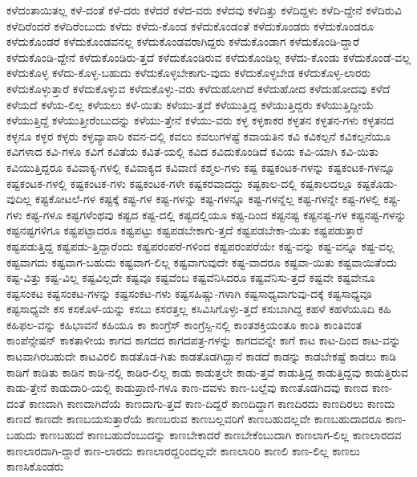 {ಕಳೆದಂತಾಯಿತಲ್ಲ
ಕಳೆ-ದಂತೆ
ಕಳೆ-ದರು
ಕಳೆದರೆ
ಕಳೆದ-ವರು
ಕಳೆದವು
ಕಳೆದಿತ್ತು
ಕಳೆದಿದ್ದಳು
ಕಳೆದಿ-ದ್ದೇನೆ
ಕಳೆದಿರುವಿ
ಕಳೆದಿರೆಂದರೆ
ಕಳೆದಿರೆಂಬುದು
ಕಳೆದು
ಕಳೆದು-ಕೊಂಡ
ಕಳೆದುಕೊಂಡಂತೆ
ಕಳೆದುಕೊಂಡರು
ಕಳೆದುಕೊಂಡರೂ
ಕಳೆದುಕೊಂಡರೆ
ಕಳೆದುಕೊಂಡವನಲ್ಲ
ಕಳೆದುಕೊಂಡವರಾಗಿದ್ದರು
ಕಳೆದುಕೊಂಡಾಗ
ಕಳೆದುಕೊಂಡಿ-ದ್ದಾರೆ
ಕಳೆದುಕೊಂಡಿ-ದ್ದೇನೆ
ಕಳೆದುಕೊಂಡಿರು-ತ್ತದೆ
ಕಳೆದುಕೊಂಡಿರುವ
ಕಳೆದುಕೊಂಡಿಲ್ಲ
ಕಳೆದು-ಕೊಂಡು
ಕಳೆದುಕೊಂಡೆ-ವಲ್ಲ
ಕಳೆದುಕೊಳ್ಳ
ಕಳೆದು-ಕೊಳ್ಳ-ಬಹುದು
ಕಳೆದುಕೊಳ್ಳಬೇಕಾಗು-ವುದು
ಕಳೆದುಕೊಳ್ಳಬೇಡ
ಕಳೆದುಕೊಳ್ಳ-ಲಾರರು
ಕಳೆದುಕೊಳ್ಳುತ್ತಾರೆ
ಕಳೆದುಕೊಳ್ಳುವ
ಕಳೆದುಕೊಳ್ಳು-ವರು
ಕಳೆದುಹೋಗಿದೆ
ಕಳೆದುಹೋದ
ಕಳೆದುಹೋದವು
ಕಳೆದೆ
ಕಳೆಯದೆ
ಕಳೆಯ-ಲಿಲ್ಲ
ಕಳೆಯಲು
ಕಳೆ-ಯಿತು
ಕಳೆಯು-ತ್ತದೆ
ಕಳೆಯುತ್ತಿದ್ದ
ಕಳೆಯುತ್ತಿದ್ದರು
ಕಳೆಯುತ್ತಿದ್ದೀಯೆ
ಕಳೆಯುತ್ತಿದ್ದೆ
ಕಳೆಯುತ್ತೀರೆಂಬುದನ್ನು
ಕಳೆಯು-ತ್ತೇನೆ
ಕಳೆಯು-ವರು
ಕಳ್ಳ
ಕಳ್ಳಕಾಕರ
ಕಳ್ಳತನ
ಕಳ್ಳತನ-ಗಳು
ಕಳ್ಳತನದ
ಕಳ್ಳನೂ
ಕಳ್ಳರ
ಕಳ್ಳರು
ಕಳ್ಳವ್ಯಾಪಾರಿ
ಕವನ-ದಲ್ಲಿ
ಕವಲು
ಕವಲುಗಳಷ್ಟೆ
ಕವಾಯತಿನ
ಕವಿ
ಕವಿಕಲ್ಪನೆ
ಕವಿಕಲ್ಪನೆಯೂ
ಕವಿಗಳಾದ
ಕವಿ-ಗಳೂ
ಕವಿಗೆ
ಕವಿತೆಯ
ಕವಿತೆ-ಯಲ್ಲಿ
ಕವಿದ
ಕವಿದುಕೊಂಡಿದೆ
ಕವಿಯ
ಕವಿ-ಯಾಗಿ
ಕವಿ-ಯಿತು
ಕವಿಯುತ್ತಿದ್ದರೂ
ಕವಿವಾಕ್ಯ-ಗಳಲ್ಲಿ
ಕವಿವಾಕ್ಯದ
ಕವಿವಾಣಿ
ಕಶ್ಮಲ-ಗಳು
ಕಷ್ಟ
ಕಷ್ಟಕಂಟಕ-ಗಳನ್ನು
ಕಷ್ಟಕಂಟಕ-ಗಳನ್ನೂ
ಕಷ್ಟಕಂಟಕ-ಗಳಲ್ಲಿ
ಕಷ್ಟಕಂಟಕ-ಗಳು
ಕಷ್ಟಕಂಟಕ-ಗಳೇ
ಕಷ್ಟಕರವಾದದ್ದು
ಕಷ್ಟಕಾಲ-ದಲ್ಲಿ
ಕಷ್ಟಕಾಲದಲ್ಲೂ
ಕಷ್ಟಕೊಡು-ವುದಿಲ್ಲ
ಕಷ್ಟಕೋಟಲೆ-ಗಳ
ಕಷ್ಟಕ್ಕೆ
ಕಷ್ಟ-ಗಳ
ಕಷ್ಟ-ಗಳನ್ನು
ಕಷ್ಟ-ಗಳನ್ನೂ
ಕಷ್ಟ-ಗಳನ್ನೆಲ್ಲ
ಕಷ್ಟ-ಗಳನ್ನೇ
ಕಷ್ಟ-ಗಳಲ್ಲಿ
ಕಷ್ಟ-ಗಳು
ಕಷ್ಟ-ಗಳೂ
ಕಷ್ಟಗಳೆಂಥವು
ಕಷ್ಟದ
ಕಷ್ಟ-ದಲ್ಲಿ
ಕಷ್ಟದಲ್ಲಿಯೂ
ಕಷ್ಟ-ದಿಂದ
ಕಷ್ಟನಷ್ಟ
ಕಷ್ಟನಷ್ಟ-ಗಳ
ಕಷ್ಟನಷ್ಟ-ಗಳನ್ನು
ಕಷ್ಟನಷ್ಟಗಳಿಗೂ
ಕಷ್ಟಪಟ್ಟಾದರೂ
ಕಷ್ಟಪಟ್ಟು
ಕಷ್ಟಪಡಬೇಕಾಗು-ತ್ತದೆ
ಕಷ್ಟಪಡಬೇಕಾ-ಯಿತು
ಕಷ್ಟಪಡುತ್ತಾರೆ
ಕಷ್ಟಪಡುತ್ತಿದ್ದ
ಕಷ್ಟಪಡು-ತ್ತಿದ್ದಾರೆಂದು
ಕಷ್ಟಪರಂಪರೆ-ಗಳಿಂದ
ಕಷ್ಟಪರಂಪರೆಯೇ
ಕಷ್ಟ-ವನ್ನು
ಕಷ್ಟ-ವನ್ನೂ
ಕಷ್ಟ-ವಲ್ಲ
ಕಷ್ಟವಾಗದು
ಕಷ್ಟವಾಗ-ಬಹುದು
ಕಷ್ಟವಾಗ-ಲಿಲ್ಲ
ಕಷ್ಟವಾಗುವುದೇ
ಕಷ್ಟ-ವಾದರೂ
ಕಷ್ಟವಾ-ಯಿತು
ಕಷ್ಟವಾಯಿತೆಂದು
ಕಷ್ಟ-ವಿತ್ತು
ಕಷ್ಟ-ವಿಲ್ಲ
ಕಷ್ಟವಿಲ್ಲದೇ
ಕಷ್ಟವೂ
ಕಷ್ಟವೆಂಬ
ಕಷ್ಟವೆನಿಸಿದರೂ
ಕಷ್ಟವೆನಿಸು-ತ್ತದೆ
ಕಷ್ಟವೇ
ಕಷ್ಟವೇನೂ
ಕಷ್ಟಸಂಕಟ
ಕಷ್ಟಸಂಕಟ-ಗಳನ್ನು
ಕಷ್ಟಸಂಕಟ-ಗಳು
ಕಷ್ಟಸಹಿಷ್ಣು-ಗಳಾಗಿ
ಕಷ್ಟಸಾಧ್ಯವಾಗುವು-ದಕ್ಕೆ
ಕಷ್ಟಸಾಧ್ಯವೂ
ಕಷ್ಟಸಾಧ್ಯವೇ
ಕಸ
ಕಸಕೊಳೆ-ಯನ್ನು
ಕಸಬು
ಕಸರತ್ತಲ್ಲ
ಕಸಿವಿಸಿಗೊಳ್ಳು-ತ್ತದೆ
ಕಸುಬಾಗಿದ್ದ
ಕಹಳೆ
ಕಹಳೆಯೂದಿ
ಕಹಿ
ಕಹಿಫಲ-ವನ್ನು
ಕಹಿಭಾವನೆ
ಕಹಿಯೂ
ಕಾ
ಕಾಂಗ್ರೆಸ್
ಕಾಂಗ್ರೆಸ್ಸಿ-ನಲ್ಲಿ
ಕಾಂತಶಕ್ತಿಯಂತೂ
ಕಾಂತಿ
ಕಾಂತಿವಂತ
ಕಾಂಪೆನ್ಸೇಷನ್
ಕಾಕತಾಳೀಯ
ಕಾಗದ
ಕಾಗದದ
ಕಾಗದಪತ್ರ-ಗಳನ್ನು
ಕಾಗದವನ್ನೇ
ಕಾಗೆ
ಕಾಟ
ಕಾಟ-ದಿಂದ
ಕಾಟ-ವನ್ನು
ಕಾಟವಾಗಿರಬಹುದೇ
ಕಾಟವಿರಲಿ
ಕಾಡತೊಡ-ಗಿತು
ಕಾಡತೊಡಗಿದ್ದಾನೆ
ಕಾಡದೆ
ಕಾಡನ್ನು
ಕಾಡಬೇಕಷ್ಟೆ
ಕಾಡಲು
ಕಾಡಿ
ಕಾಡಿಗೆ
ಕಾಡಿತು
ಕಾಡಿನ
ಕಾಡಿ-ನಲ್ಲಿ
ಕಾಡಿರ-ಲಿಲ್ಲ
ಕಾಡು
ಕಾಡುತ್ತಲೇ
ಕಾಡು-ತ್ತವೆ
ಕಾಡುತ್ತಿದ್ದ
ಕಾಡುತ್ತಿದ್ದವು
ಕಾಡುತ್ತಿರುವ
ಕಾಡು-ತ್ತೇನೆ
ಕಾಡುದಾರಿ-ಯಲ್ಲಿ
ಕಾಡುಪ್ರಾಣಿ-ಗಳೂ
ಕಾಣ-ದವಳು
ಕಾಣ-ಬಲ್ಲೆವು
ಕಾಣತೊಡಗಿದವು
ಕಾಣದ
ಕಾಣ-ದಂತೆ
ಕಾಣದಾಗಿ
ಕಾಣದಾಗಿದೆಯೆ
ಕಾಣದಾಗು-ತ್ತದೆ
ಕಾಣ-ದಿದ್ದರೆ
ಕಾಣದಿದ್ದಾಗ
ಕಾಣದಿರದು
ಕಾಣದಿರಲು
ಕಾಣದು
ಕಾಣದೆ
ಕಾಣದೇ
ಕಾಣಬಯಸುತ್ತಾರೆಯೆ
ಕಾಣಬರುವ
ಕಾಣಬಲ್ಲವರಿಗೆ
ಕಾಣಬಹುದಲ್ಲವೇ
ಕಾಣಬಹುದಾದರೂ
ಕಾಣ-ಬಹುದು
ಕಾಣಬಹುದೆ
ಕಾಣಬಹುದೆಂಬುದನ್ನು
ಕಾಣಬೇಕಾದರೆ
ಕಾಣಬೇಕೆಂಬುದಾಗಿ
ಕಾಣಲಾಗ-ಲಿಲ್ಲ
ಕಾಣಲಾರದವ
ಕಾಣಲಾರದಾಗಿ-ದ್ದಾರೆ
ಕಾಣ-ಲಾರದು
ಕಾಣಲಾರದ್ದರಿಂದಲ್ಲವೇ
ಕಾಣಲಾರಿರಿ
ಕಾಣಲಿ
ಕಾಣ-ಲಿಲ್ಲ
ಕಾಣಲು
ಕಾಣಸಿಕೊಂಡರು
}
